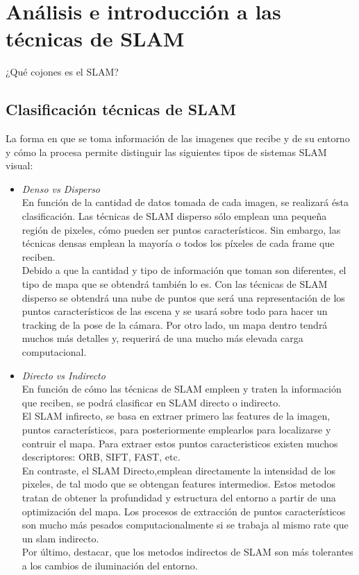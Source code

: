 \section{Análisis e introducción a las técnicas de SLAM}
¿Qué cojones es el SLAM?

\subsection{Clasificación técnicas de SLAM}
La forma en que se toma información de las imagenes que recibe y de su entorno y cómo la procesa permite distinguir las siguientes tipos de sistemas
SLAM visual:
\begin{itemize}
    \item \textit{Denso vs Disperso} \\
    En función de la cantidad de datos tomada de cada imagen, se realizará ésta clasificación. Las técnicas de SLAM disperso sólo emplean una pequeña
    región de pixeles, cómo pueden ser puntos característicos. Sin embargo, las técnicas densas emplean la mayoría o todos los píxeles de cada frame
    que reciben. \\
    Debido a que la cantidad y tipo de información que toman son diferentes, el tipo de mapa que se obtendrá también lo es. Con las técnicas de SLAM
    disperso se obtendrá una nube de puntos que será una representación de los puntos característicos de las escena y se usará sobre todo para hacer
    un tracking de la pose de la cámara. Por otro lado, un mapa dentro tendrá muchos más detalles y, requerirá de una mucho más elevada carga computacional.

 \item \textit{Directo vs Indirecto} \\
En función de cómo las técnicas de SLAM empleen y traten la información que reciben, se podrá clasificar en SLAM directo o indirecto.\\
El SLAM infirecto, se basa en extraer primero las features de la imagen, puntos característicos, para posteriormente emplearlos para localizarse y contruir
el mapa. Para extraer estos puntos caracteristicos existen muchos descriptores: ORB, SIFT, FAST, etc. \\
En contraste, el SLAM Directo,emplean directamente la intensidad de los pixeles, de tal modo que se obtengan features intermedios. Estos metodos tratan de 
obtener la profundidad y estructura del entorno a partir de una optimización del mapa. Los procesos de extracción de puntos característicos son mucho más
pesados computacionalmente si se trabaja al mismo rate que un slam indirecto.\\
Por último, destacar, que los metodos indirectos de SLAM son más tolerantes a los cambios de iluminación del entorno.\\


\end{itemize}
